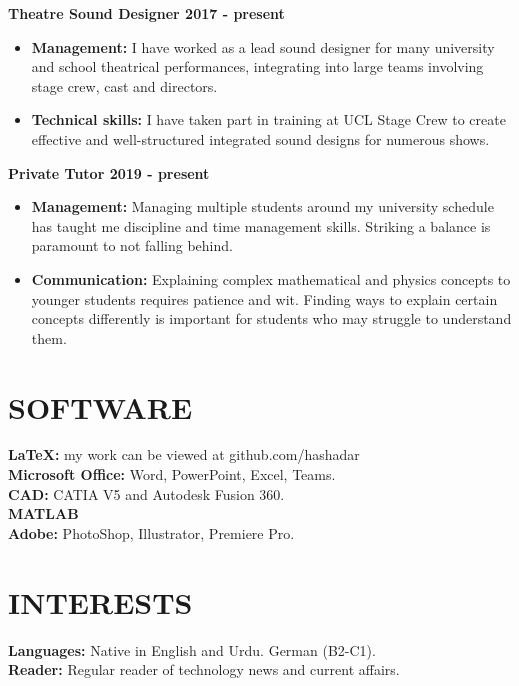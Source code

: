 \documentclass[margin, 10pt]{res} %
\begin{document}
\begin{resume}
\textbf{Theatre Sound Designer \hfill 2017 - present}
\\
\begin{itemize}
  \item \textbf{Management:} I have worked as a lead sound designer for many university and school theatrical performances, integrating into large teams involving stage crew, cast and directors.
  \item \textbf{Technical skills:} I have taken part in training at UCL Stage Crew to create effective and well-structured integrated sound designs for numerous shows.
\end{itemize}

\textbf{Private Tutor \hfill 2019 - present}
\\
\begin{itemize}
  \item \textbf{Management:} Managing multiple students around my university schedule has taught me discipline and time management skills. Striking a balance is paramount to not falling behind. 
  \item \textbf{Communication:} Explaining complex mathematical and physics concepts to \\ younger students requires patience and wit. Finding ways to explain certain concepts differently is important for students who may struggle to understand them.
\end{itemize}


\section{SOFTWARE}
\textbf{LaTeX:} my work can be viewed at github.com/hashadar\\
\textbf{Microsoft Office:} Word, PowerPoint, Excel, Teams.\\
\textbf{CAD:} CATIA V5 and Autodesk Fusion 360.\\
\textbf{MATLAB}\\
\textbf{Adobe:} PhotoShop, Illustrator, Premiere Pro.


\section{INTERESTS} 
\textbf{Languages:} Native in English and Urdu. German (B2-C1).\\
\textbf{Reader:} Regular reader of technology news and current affairs.



\end{resume}
\end{document}
